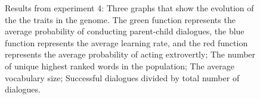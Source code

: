 \begin{figure}
    \centering
    \ContinuedFloat
    \hfill
    \par \bigskip
    \hfill
    \caption{Results from experiment 4:  Three graphs that show the evolution of the the traits in the genome. The green function represents the average probability of conducting parent-child dialogues, the blue function represents the average learning rate, and the red function represents the average probability of acting extrovertly;  The number of unique highest ranked words in the population;  The average vocabulary size;  Successful dialogues divided by total number of dialogues.}
    \label{fig:exp4.1}
\end{figure}

